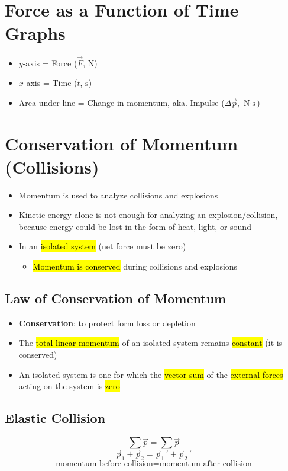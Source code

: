 \documentclass[a4paper,12pt]{article}
\begin{document}
\pagebreak

\section{Force as a Function of Time Graphs}
\begin{itemize}
    \item{$y$-axis = Force ($\vec{F}$, $\si{\N}$)}
    \item{$x$-axis = Time ($t$, $\si{\s}$)}
    \item{Area under line = Change in momentum, aka. Impulse ($\Delta{\vec{p}}$, $\si{\N\cdot\s}$)}
\end{itemize}

\section{Conservation of Momentum (Collisions)}
\begin{itemize}
    \item{Momentum is used to analyze collisions and explosions}
    \item{Kinetic energy alone is not enough for analyzing an explosion/collision, because energy could be lost in the form of heat, light, or sound}
    \item{
        In an \hl{isolated system} (net force must be zero)
        \begin{itemize}
            \item{\hl{Momentum is conserved} during collisions and explosions}
        \end{itemize}
    }
\end{itemize}

\subsection{Law of Conservation of Momentum}
\begin{itemize}
    \item{\textbf{Conservation}: to protect form loss or depletion}
    \item{The \hl{total linear momentum} of an isolated system remains \hl{constant} (it is conserved)}
    \item{An isolated system is one for which the \hl{vector sum} of the \hl{external forces} acting on the system is \hl{zero}}
\end{itemize}

\subsection{Elastic Collision}
$$\sum\vec{p} = \sum\vec{p}$$
$$\vec{p}_1 + \vec{p}_2 = \vec{p}_1\,\!' + \vec{p}_2\,\!'$$
$$\textrm{momentum before collision} = \textrm{momentum after collision}$$
\end{document}
